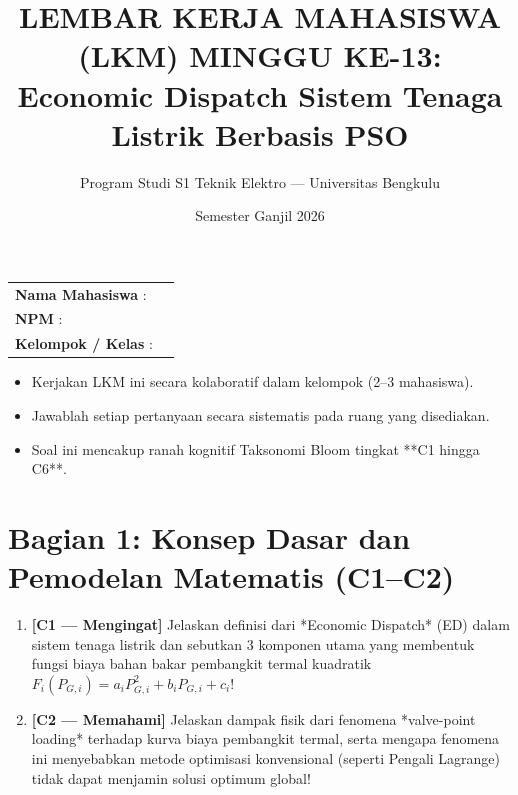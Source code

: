 \documentclass[11pt,a4paper]{article}
\title{\vspace{-1cm}\textbf{LEMBAR KERJA MAHASISWA (LKM) MINGGU KE-13:}\\Economic Dispatch Sistem Tenaga Listrik Berbasis PSO}
\author{Program Studi S1 Teknik Elektro --- Universitas Bengkulu}
\date{Semester Ganjil 2026}
\begin{document}
\maketitle

\begin{tcolorbox}[colback=unibblue!5,colframe=unibblue,title=\textbf{Identitas Mahasiswa dan Instruksi}]
\begin{tabular}{ll}
\textbf{Nama Mahasiswa} : & \hrulefill\hspace{6cm} \\
\textbf{NPM} : & \hrulefill\hspace{6cm} \\
\textbf{Kelompok / Kelas} : & \hrulefill\hspace{6cm} \\
\end{tabular}
\vspace{0.2cm}
\begin{itemize}[leftmargin=*]
    \item Kerjakan LKM ini secara kolaboratif dalam kelompok (2--3 mahasiswa).
    \item Jawablah setiap pertanyaan secara sistematis pada ruang yang disediakan.
    \item Soal ini mencakup ranah kognitif Taksonomi Bloom tingkat **C1 hingga C6**.
\end{itemize}
\end{tcolorbox}

\vspace{0.3cm}

\section*{Bagian 1: Konsep Dasar dan Pemodelan Matematis (C1--C2)}

\begin{enumerate}[label=\textbf{Soal \arabic*:}, leftmargin=*]
    \item \textbf{[C1 --- Mengingat]} Jelaskan definisi dari *Economic Dispatch* (ED) dalam sistem tenaga listrik dan sebutkan 3 komponen utama yang membentuk fungsi biaya bahan bakar pembangkit termal kuadratik $F_i(P_{G,i}) = a_i P_{G,i}^2 + b_i P_{G,i} + c_i$!
    
    \begin{tcolorbox}[colback=white,colframe=gray!50,height=3cm,title=Ruang Jawaban Soal 1]
    \end{tcolorbox}

    \item \textbf{[C2 --- Memahami]} Jelaskan dampak fisik dari fenomena *valve-point loading* terhadap kurva biaya pembangkit termal, serta mengapa fenomena ini menyebabkan metode optimisasi konvensional (seperti Pengali Lagrange) tidak dapat menjamin solusi optimum global!
    
    \begin{tcolorbox}[colback=white,colframe=gray!50,height=3.5cm,title=Ruang Jawaban Soal 2]
    \end{tcolorbox}
\end{enumerate}
\end{document}
